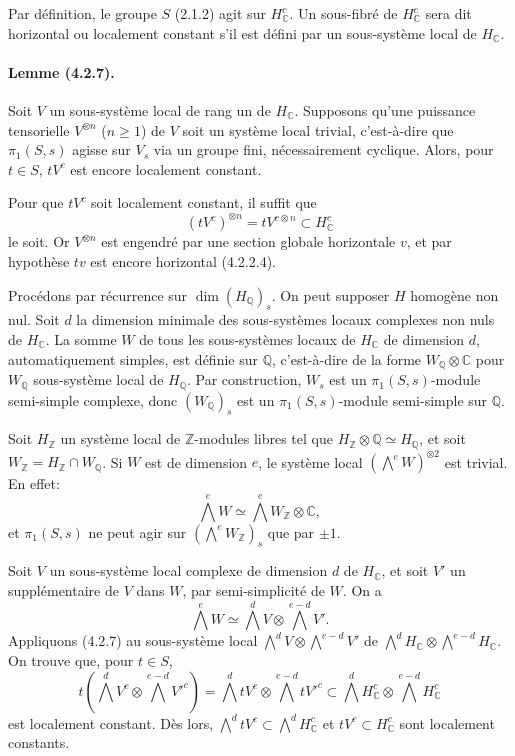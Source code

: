 \documentclass[10pt]{article}
\newcommand{\C}{\mathbb C}
\newcommand{\Q}{\mathbb Q}
\newcommand{\Z}{\mathbb Z}
\newcommand{\fg}{\guillemotright}
\newcommand{\og}{\guillemotleft}
\begin{document}
Par définition, le groupe $S$ (2.1.2) agit sur $H_\C^c$. Un sous-fibré de $H_\C^c$ sera dit horizontal ou localement constant s'il est défini par un sous-système local de $H_\C$.

\paragraph{Lemme (4.2.7).} Soit $V$ un sous-système local de rang un de $H_\C$. Supposons qu'une puissance tensorielle $V^{\otimes n}$ ($n\ge1$) de $V$ soit un système local trivial, c'est-à-dire que $\pi_1(S,s)$ agisse sur $V_s$ via un groupe fini, nécessairement cyclique. Alors, pour $t\in S$, $tV^c$ est encore localement constant.

Pour que $tV^c$ soit localement constant, il suffit que
\[
(tV^c)^{\otimes n}=tV^{c\otimes n}\subset H_\C^c
\]
le soit. Or $V^{\otimes n}$ est engendré par une section globale horizontale $v$, et par hypothèse $tv$ est encore horizontal (4.2.2.4).

Procédons par récurrence sur $\dim(H_\Q)_s$. On peut supposer $H$ homogène non nul. Soit $d$ la dimension minimale des sous-systèmes locaux complexes non nuls de $H_\C$. La somme $W$ de tous les sous-systèmes locaux de $H_\C$ de dimension $d$, automatiquement simples, est \og définie sur $\Q$\fg, c'est-à-dire de la forme $W_\Q\otimes\C$ pour $W_\Q$ sous-système local de $H_\Q$. Par construction, $W_s$ est un $\pi_1(S,s)$-module semi-simple complexe, donc $(W_\Q)_s$ est un $\pi_1(S,s)$-module semi-simple sur $\Q$.

Soit $H_\Z$ un système local de $\Z$-modules libres tel que $H_\Z\otimes\Q\simeq H_\Q$, et soit $W_\Z=H_\Z\cap W_\Q$. Si $W$ est de dimension $e$, le système local $(\bigwedge^e W)^{\otimes2}$ est trivial. En effet:
\[
\bigwedge^e W\simeq \bigwedge^e W_\Z\otimes\C,
\]
et $\pi_1(S,s)$ ne peut agir sur $(\bigwedge^eW_\Z)_s$ que par $\pm1$.

Soit $V$ un sous-système local complexe de dimension $d$ de $H_\C$, et soit $V'$ un supplémentaire de $V$ dans $W$, par semi-simplicité de $W$. On a
\[
\bigwedge^e W\simeq \bigwedge^d V\otimes\bigwedge^{e-d}V'.
\]
Appliquons (4.2.7) au sous-système local $\bigwedge^dV\otimes\bigwedge^{e-d}V'$ de $\bigwedge^dH_\C\otimes\bigwedge^{e-d}H_\C$. On trouve que, pour $t\in S$,
\[
t(\bigwedge^dV^c\otimes\bigwedge^{e-d}V'^c)=
\bigwedge^d tV^c\otimes\bigwedge^{e-d}tV'^c
\subset \bigwedge^dH_\C^c\otimes\bigwedge^{e-d}H_\C^c
\]
est localement constant. Dès lors, $\bigwedge^d tV^c\subset\bigwedge^dH_\C^c$ et $tV^c\subset H_\C^c$ sont localement constants.
\end{document}
